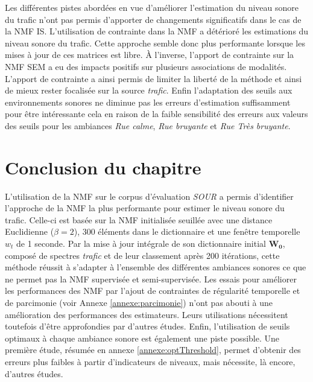 Les différentes pistes abordées en vue d'améliorer l'estimation du niveau sonore du trafic n'ont pas permis d'apporter de changements significatifs dans le cas de la NMF IS. L'utilisation de contrainte dans la NMF a détérioré les estimations du niveau sonore du trafic. Cette approche semble donc plus performante lorsque les mises à jour de ces matrices est libre. À l'inverse, l'apport de contrainte sur la NMF SEM a eu des impacts positifs sur plusieurs associations de modalités. L'apport de contrainte a ainsi permis de limiter la liberté de la méthode et ainsi de mieux rester focalisée sur la source \textit{trafic}. Enfin l'adaptation des seuils aux environnements sonores ne diminue pas les erreurs d'estimation suffisamment pour être intéressante cela en raison de la faible sensibilité des erreurs aux valeurs des seuils pour les ambiances \textit{Rue calme}, \textit{Rue bruyante} et \textit{Rue Très bruyante}.
\\

\section{Conclusion du chapitre}
L'utilisation de la NMF sur le corpus d'évaluation \textit{SOUR} a permis d'identifier l'approche de la NMF la plus performante pour estimer le niveau sonore du trafic. Celle-ci est basée sur la NMF initialisée seuillée avec une distance Euclidienne ($\beta = 2$), 300 éléments dans le dictionnaire et une fenêtre temporelle $w_t$ de 1 seconde. Par la mise à jour intégrale de son dictionnaire initial $\mathbf{W_0}$, composé de spectres \textit{trafic} et de leur classement après 200 itérations, cette méthode réussit à s'adapter à l'ensemble des différentes ambiances sonores ce que ne permet pas la NMF supervisée et semi-supervisée. Les essais pour améliorer les performances des NMF par l'ajout de contraintes de régularité temporelle et de parcimonie (voir Annexe \ref{annexe:parcimonie}) n'ont pas abouti à une amélioration des performances des estimateurs. Leurs utilisations nécessitent toutefois d'être approfondies par d'autres études. Enfin, l'utilisation de seuils optimaux à chaque ambiance sonore est également une piste possible. Une première étude, résumée en annexe \ref{annexe:optThreshold}, permet d'obtenir des erreurs plus faibles à partir d'indicateurs de niveaux, mais nécessite, là encore, d'autres études. 

%